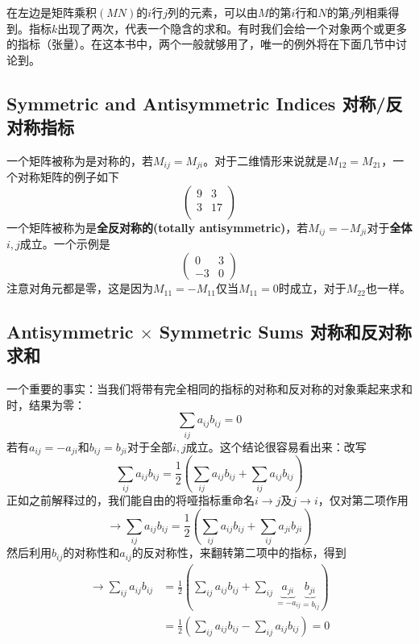 在左边是矩阵乘积$(MN)$的$i$行$j$列的元素，可以由$M$的第$i$行和$N$的第$j$列相乘得到。指标$k$出现了两次，代表一个隐含的求和。有时我们会给一个对象两个或更多的指标（张量）。在这本书中，两个一般就够用了，唯一的例外将在下面几节中讨论到。

\subsection[对称/反对称指标]{Symmetric and Antisymmetric Indices 对称/反对称指标}\label{appendix.B.5.3}
一个矩阵被称为是对称的，若$M_{ij}=M_{ji}$。对于二维情形来说就是$M_{12}=M_{21}$，一个对称矩阵的例子如下
\begin{equation}
\begin{pmatrix}
9 & 3 \\ 3 & 17 \\
\end{pmatrix}
\end{equation}
一个矩阵被称为是{\bfseries 全反对称的(totally antisymmetric)}，若$M_{ij}=-M_{ji}$对于{\bfseries 全体}$i,j$成立。一个示例是
\begin{equation}
\begin{pmatrix}
0 & 3 \\ -3 & 0
\end{pmatrix}
\end{equation}
注意对角元都是零，这是因为$M_{11}=-M_{11}$仅当$M_{11}=0$时成立，对于$M_{22}$也一样。
\subsection[对称和反对称求和]{Antisymmetric $\times$ Symmetric Sums 对称和反对称求和}\label{appendix.B.5.4}
一个重要的事实：当我们将带有完全相同的指标的对称和反对称的对象乘起来求和时，结果为零：
\begin{equation}
\sum\limits_{ij}a_{ij}b_{ij} = 0
\end{equation}
若有$a_{ij}=-a_{ji}$和$b_{ij}=b_{ji}$对于全部$i,j$成立。这个结论很容易看出来：改写
\begin{equation}
\sum\limits_{ij}a_{ij}b_{ij} = \frac{1}{2}\left(\sum\limits_{ij}a_{ij}b_{ij}+\sum\limits_{ij}a_{ij}b_{ij}\right)
\end{equation}
正如之前解释过的，我们能自由的将哑指标重命名$i\rightarrow j$及$j\rightarrow i$，仅对第二项作用
\begin{equation}
\rightarrow \sum\limits_{ij}a_{ij}b_{ij} = \frac{1}{2}\left(\sum\limits_{ij}a_{ij}b_{ij}+\sum\limits_{ij}a_{ji}b_{ji}\right)
\end{equation}
然后利用$b_{ij}$的对称性和$a_{ij}$的反对称性，来翻转第二项中的指标，得到%
\begin{equation}
\begin{aligned}
\rightarrow \sum\limits_{ij}a_{ij}b_{ij} &= \frac{1}{2}\left(\sum\limits_{ij}a_{ij}b_{ij}+\sum\limits_{ij}\underbrace{a_{ji}}_{=-a_{ij}}\underbrace{b_{ji}}_{=b_{ij}}\right)\\
 &= \frac{1}{2}\left(\sum\limits_{ij}a_{ij}b_{ij}-\sum\limits_{ij}a_{ij}b_{ij}\right) = 0
\end{aligned}
\end{equation}
